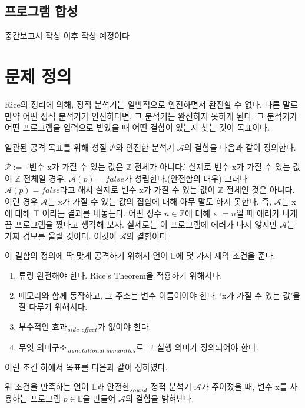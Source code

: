 \documentclass[ko]{snu-cse-bsc-thesis}
\newcommand{\alt}[2]{#1\textsubscript{\ensuremath{\text{\scriptsize\textit{#2}}}}}
\begin{document}
\section{프로그램 합성}\label{sec:program_synthesis}
중간보고서 작성 이후 작성 예정이다

\chapter{문제 정의}\label{chap:problem_definition}

Rice의 정리에 의해, 정적 분석기는 일반적으로 안전하면서 완전할 수 없다.
다른 말로 만약 어떤 정적 분석기가 안전하다면, 그 분석기는 완전하지 못하게 된다.
그 분석기가 어떤 프로그램을 입력으로 받았을 때 어떤 결함이 있는지 찾는 것이 목표이다.

일관된 공격 목표를 위해 성질 $\mathscr{P}$와 안전한 분석기 $\mathcal{A}$의 결함을 다음과 같이 정의한다.


$\mathscr{P} :=$ `변수 x가 가질 수 있는 값은 $\mathbb{Z}$ 전체가 아니다.'
실제로 변수 x가 가질 수 있는 값이 $\mathbb{Z}$ 전체일 경우, $\mathcal{A}(p) = false$가 성립한다.(안전함의 대우)
그러나 $\mathcal{A}(p) = false$라고 해서 실제로 변수 x가 가질 수 있는 값이 $\mathbb{Z}$ 전체인 것은 아니다.
이런 경우 $\mathcal{A}$는 x가 가질 수 있는 값의 집합에 대해 아무 말도 하지 못한다.
즉, $\mathcal{A}$는 x에 대해 $\top$ 이라는 결과를 내놓는다. 
어떤 정수 $n \in \mathbb{Z}$에 대해 x $= n$일 때 에러가 나게끔 프로그램을 짰다고 생각해 보자.
실제로는 이 프로그램에 에러가 나지 않지만 $\mathcal{A}$는 가짜 경보를 울릴 것이다.
이것이 $\mathcal{A}$의 결함이다.

이 결함의 정의에 딱 맞게 공격하기 위해서 언어 $\mathbb{L}$에 몇 가지 제약 조건을 준다. 
\begin{enumerate}
     \item 튜링 완전해야 한다. Rice's Theorem을 적용하기 위해서다.
     \item 메모리와 함께 동작하고, 그 주소는 변수 이름이어야 한다. `x가 가질 수 있는 값'을 잘 다루기 위해서다.
     \item \alt{부수적인 효과}{side effect}가 없어야 한다.
     \item \alt{무엇 의미구조}{denotational semantics}로 그 실행 의미가 정의되어야 한다.
\end{enumerate}

이런 조건 하에서 목표를 다음과 같이 정하였다.

\begin{center}
     위 조건을 만족하는 언어 $\mathbb{L}$과 \alt{안전한}{sound} 정적 분석기 $\mathcal{A}$가 주어졌을 때,
     변수 x를 사용하는 프로그램 $p \in \mathbb{L}$을 만들어 $\mathcal{A}$의 결함을 밝혀낸다.
\end{center}
\end{document}
